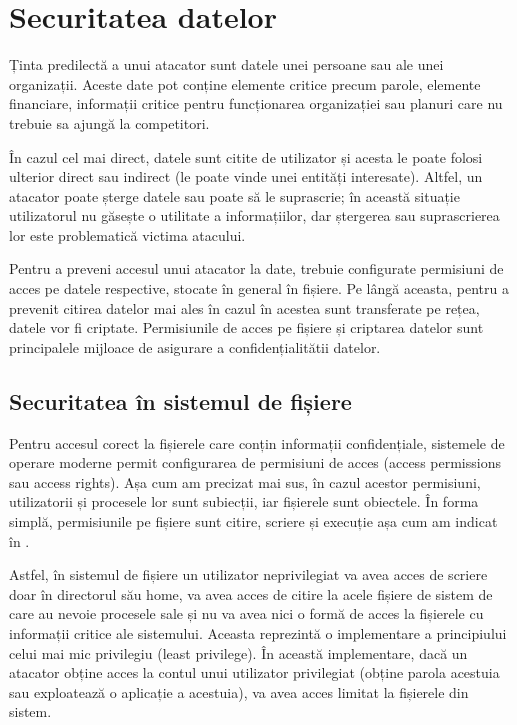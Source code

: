\section{Securitatea datelor}
\label{sec:sec:data}

Ținta predilectă a unui atacator sunt datele unei persoane sau ale unei organizații. Aceste date pot conține elemente critice precum parole, elemente financiare, informații critice pentru funcționarea organizației sau planuri care nu trebuie sa ajungă la competitori.

În cazul cel mai direct, datele sunt citite de utilizator și acesta le poate folosi ulterior direct sau indirect (le poate vinde unei entități interesate). Altfel, un atacator poate șterge datele sau poate să le suprascrie; în această situație utilizatorul nu găsește o utilitate a informațiilor, dar ștergerea sau suprascrierea lor este problematică victima atacului.

Pentru a preveni accesul unui atacator la date, trebuie configurate permisiuni de acces pe datele respective, stocate în general în fișiere. Pe lângă aceasta, pentru a prevenit citirea datelor mai ales în cazul în acestea sunt transferate pe rețea, datele vor fi criptate. Permisiunile de acces pe fișiere și criptarea datelor sunt principalele mijloace de asigurare a confidențialitătii datelor.

\subsection{Securitatea în sistemul de fișiere}
\label{sec:sec:fs}

Pentru accesul corect la fișierele care conțin informații confidențiale, sistemele de operare moderne permit configurarea de permisiuni de acces (access permissions sau access rights). Așa cum am precizat mai sus, în cazul acestor permisiuni, utilizatorii și procesele lor sunt subiecții, iar fișierele sunt obiectele. În forma simplă, permisiunile pe fișiere sunt citire, scriere și execuție așa cum am indicat în .

Astfel, în sistemul de fișiere un utilizator neprivilegiat va avea acces de scriere doar în directorul său home, va avea acces de citire la acele fișiere de sistem de care au nevoie procesele sale și nu va avea nici o formă de acces la fișierele cu informații critice ale sistemului. Aceasta reprezintă o implementare a principiului celui mai mic privilegiu (least privilege). În această implementare, dacă un atacator obține acces la contul unui utilizator privilegiat (obține parola acestuia sau exploatează o aplicație a acestuia), va avea acces limitat la fișierele din sistem.

